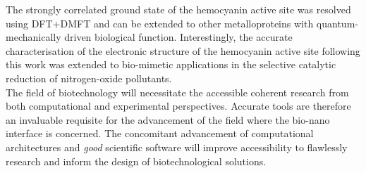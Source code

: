 The strongly correlated ground state of the hemocyanin active site was resolved using DFT+DMFT and can be extended to other metalloproteins with quantum-mechanically driven biological function. Interestingly, the accurate characterisation of the electronic structure of the hemocyanin active site following this work was extended to bio-mimetic applications in the selective catalytic reduction of nitrogen-oxide pollutants.\cite{chen2019comparative} \\

The field of biotechnology will necessitate the accessible coherent research from both computational and experimental perspectives. Accurate tools are therefore an invaluable requisite for the advancement of the field where the bio-nano interface is concerned. The concomitant advancement of computational architectures and \textit{good} scientific software will improve accessibility to flawlessly research and inform the design of biotechnological solutions. 
